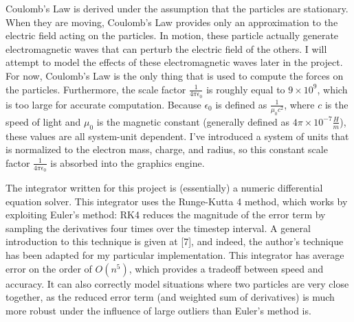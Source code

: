 \documentclass[10pt]{article}
\begin{document}
Coulomb's Law is derived under the assumption that the particles are stationary. When they are moving, Coulomb's Law provides only an approximation to the electric field acting on the particles. In motion, these particle actually generate electromagnetic waves that can perturb the electric field of the others. I will attempt to model the effects of these electromagnetic waves later in the project. For now, Coulomb's Law is the only thing that is used to compute the forces on the particles. Furthermore, the scale factor $\frac{1}{4\pi\epsilon_0}$ is roughly equal to $9 \times 10^9$, which is too large for accurate computation. Because $\epsilon_0$ is defined as $\frac{1}{\mu_0 c^2}$, where $c$ is the speed of light and $\mu_0$ is the magnetic constant (generally defined as $4\pi \times 10^{-7} \frac{H}{m}$), these values are all system-unit dependent. I've introduced a system of units that is normalized to the electron mass, charge, and radius, so this constant scale factor $\frac{1}{4\pi\epsilon_0}$ is absorbed into the graphics engine.

The integrator written for this project is (essentially) a numeric differential equation solver. This integrator uses the Runge-Kutta 4 method, which works by exploiting Euler's method: RK4 reduces the magnitude of the error term by sampling the derivatives four times over the timestep interval. A general introduction to this technique is given at [7], and indeed, the author's technique has been adapted for my particular implementation. This integrator has average error on the order of $O(n^5)$, which provides a tradeoff between speed and accuracy. It can also correctly model situations where two particles are very close together, as the reduced error term (and weighted sum of derivatives) is much more robust under the influence of large outliers than Euler's method is.

\clearpage
\end{document}
